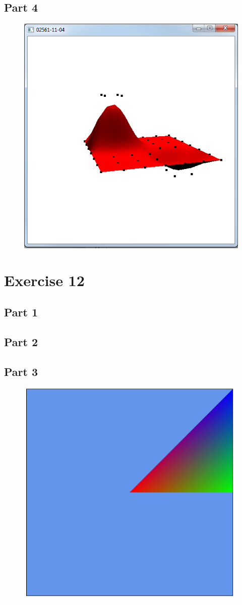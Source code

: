 \documentclass[11pt]{article}
\begin{document}
\subsection{Part 4}
\begin{figure}[H]
	\centering
	\includegraphics[width=0.5\linewidth]{images/e11p4}
	\label{fig:e11p4}
\end{figure}


\section{Exercise 12}
\subsection{Part 1}
\subsection{Part 2}
\subsection{Part 3}
\begin{figure}[H]
	\centering
	\includegraphics[width=0.5\linewidth]{images/e12p3}
	\label{fig:e12p3}
\end{figure}
\end{document}
